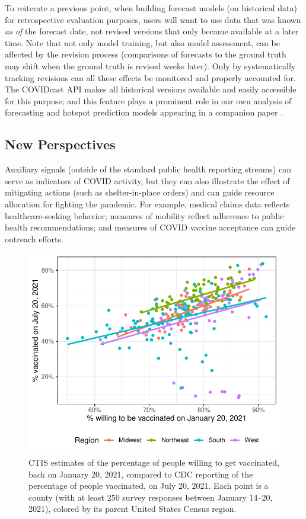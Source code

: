 \documentclass[9pt,twocolumn,twoside,lineno]{pnas-new}
\begin{document}
To reiterate a previous point, when building forecast models (on historical
data) for retrospective evaluation purposes, users will want to use data that
was known \textit{as of} the forecast date, not revised versions that only
became available at a later time. Note that not only model training, but also
model assessment, can be affected by the revision process (comparisons of
forecasts to the ground truth may shift when the ground truth is revised weeks
later). Only by systematically tracking revisions can all these effects be
monitored and properly accounted for.  The COVIDcast API makes all historical
versions available and easily accessible for this purpose; and this feature
plays a prominent role in our own analysis of forecasting and hotspot prediction
models appearing in a companion paper \cite{McDonald:2021}.

\subsection{New Perspectives}

Auxiliary signals (outside of the standard public health reporting streams) can
serve as indicators of COVID activity, but they can also illustrate the effect
of mitigating actions (such as shelter-in-place orders) and can guide resource
allocation for fighting the pandemic. For example, medical claims data reflects
healthcare-seeking behavior; measures of mobility reflect adherence to public
health recommendations; and measures of COVID vaccine acceptance can guide
outreach efforts.

\begin{figure}
  \centering
  \includegraphics[width=\columnwidth]{fig/vaccine-intent-compare.pdf}
  \caption{CTIS estimates of the percentage of people willing to get
    vaccinated, back on January 20, 2021, compared to CDC reporting of the  
    percentage of people vaccinated, on July 20, 2021. Each point is a county
    (with at least 250 survey responses between January 14--20, 2021), colored
    by its parent United States Census region.}     
  \label{fig:vaccine-intent-compare}
\end{figure}
\end{document}
